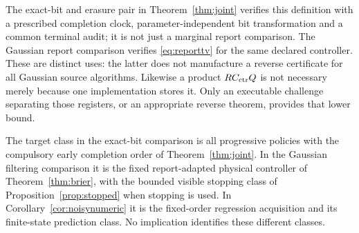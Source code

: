 The exact-bit and erasure pair in Theorem~\ref{thm:joint} verifies this definition with a prescribed completion clock, parameter-independent bit transformation and a common terminal audit; it is not just a marginal report comparison. The Gaussian report comparison verifies \eqref{eq:reporttv} for the same declared controller. These are distinct uses: the latter does not manufacture a reverse certificate for all Gaussian source algorithms. Likewise a product $RC_{\rm ctr}Q$ is not necessary merely because one implementation stores it. Only an executable challenge separating those registers, or an appropriate reverse theorem, provides that lower bound.

The target class in the exact-bit comparison is all progressive policies with the compulsory early completion order of Theorem~\ref{thm:joint}. In the Gaussian filtering comparison it is the fixed report-adapted physical controller of Theorem~\ref{thm:brier}, with the bounded visible stopping class of Proposition~\ref{prop:stopped} when stopping is used. In Corollary~\ref{cor:noisynumeric} it is the fixed-order regression acquisition and its finite-state prediction class. No implication identifies these different classes.
